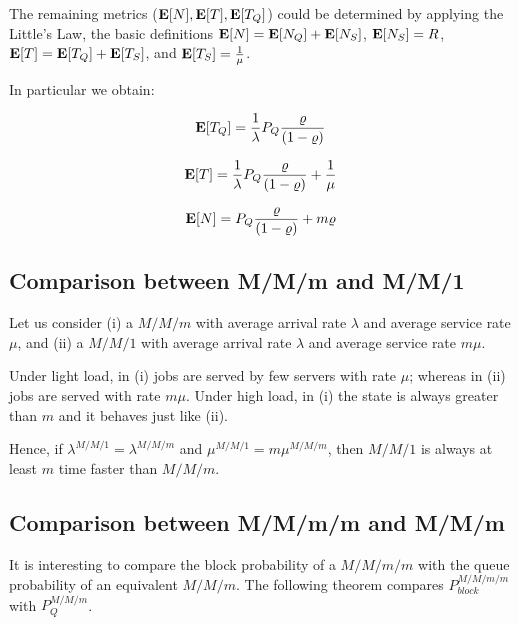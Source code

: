 The remaining metrics ($\mathbf{E}[N],\mathbf{E}[T],\mathbf{E}[T_{Q}]$) could be determined by applying the Little's Law, the basic definitions 
$\mathbf{E}[N]=\mathbf{E}[N_{Q}]+\mathbf{E}[N_{S}]$, 
$\mathbf{E}[N_{S}]=R$, 
$\mathbf{E}[T]=\mathbf{E}[T_{Q}]+\mathbf{E}[T_{S}]$, and
$\mathbf{E}[T_{S}]=\frac{1}{\mu}$.

In particular we obtain:

\begin{equation}
\label{eqn:M-M-m-Delay}
\expected{T_{Q}} = \frac{1}{\lambda} P_{Q} \frac{\varrho}{(1-\varrho)}
\end{equation}

\begin{equation}
\label{eqn:M-M-m-Reponse-Time}
\expected{T} = \frac{1}{\lambda} P_{Q} \frac{\varrho}{(1-\varrho)} + \frac{1}{\mu}
\end{equation}

\begin{equation}
\label{eqn:M-M-m-System-Jobs}
\expected{N} = P_{Q} \frac{\varrho}{(1-\varrho)} + m\varrho
\end{equation}




\subsection{Comparison between M/M/m and M/M/1}
\label{sec:Comparison-M-M-m-And-M-M-1}

Let us consider 
(i) a $M/M/m$ with average arrival rate $\lambda$ and average service rate $\mu$, and
(ii) a $M/M/1$ with average arrival rate $\lambda$ and average service rate $m \mu$.

Under light load, in (i) jobs are served by few servers with rate $\mu$; whereas in (ii) jobs are served with rate $m \mu$.
Under high load, in (i) the state is always greater than $m$ and it behaves just like (ii).

Hence, if $\lambda^{M/M/1} = \lambda^{M/M/m}$ and $\mu^{M/M/1} = m \mu^{M/M/m}$, then $M/M/1$ is always at least $m$ time faster than $M/M/m$.




\subsection{Comparison between M/M/m/m and M/M/m}
\label{sec:Comparison-M-M-m-m-And-M-M-m}

It is interesting to compare the block probability of a $M/M/m/m$ with the queue probability of an equivalent $M/M/m$.
The following theorem compares $P_{block}^{M/M/m/m}$ with $P_{Q}^{M/M/m}$.

